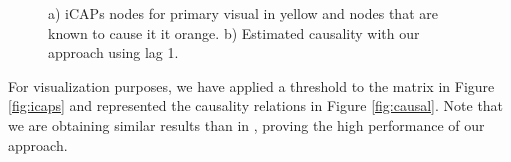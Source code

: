 \documentclass[10pt,conference,compsocconf]{IEEEtran}
\begin{document}
\begin{figure}
    \vspace{-2mm}
    \caption{a) iCAPs nodes for primary visual in yellow and nodes that are known to cause it it orange. b) Estimated causality with our approach using lag 1.}%
    \vspace{-8mm}
    \label{fig:brain}%
\end{figure}

For visualization purposes, we have applied a threshold to the matrix in Figure  \ref{fig:icaps} and represented the causality relations in Figure \ref{fig:causal}. Note that we are obtaining similar results than in \cite{bolton2018interactions}, proving the high performance of our approach.
\end{document}
